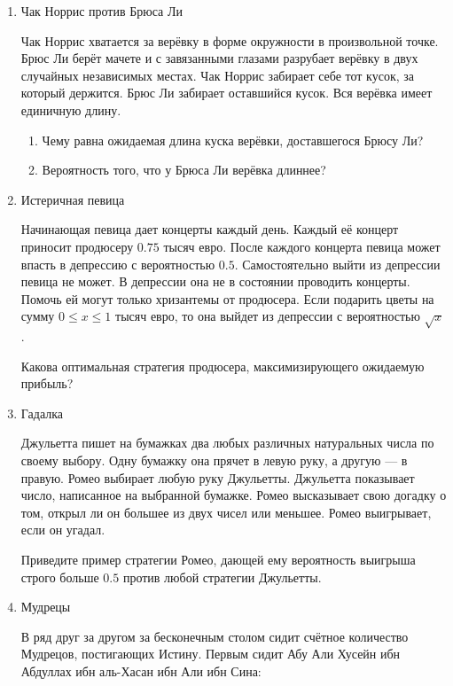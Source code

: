 \begin{enumerate}
\item Чак Норрис против Брюса Ли

Чак Норрис хватается за верёвку в форме окружности в произвольной точке.
Брюс Ли берёт мачете и с завязанными глазами разрубает верёвку в двух случайных
независимых местах. Чак Норрис забирает себе тот кусок, за который держится.
Брюс Ли забирает оставшийся кусок.  Вся верёвка имеет единичную длину.
\begin{enumerate}
\item Чему равна ожидаемая длина куска верёвки, доставшегося Брюсу Ли?
\item  Вероятность того, что у Брюса Ли верёвка длиннее?
\end{enumerate}

\item Истеричная певица

Начинающая певица дает концерты каждый день. Каждый её концерт приносит продюсеру
$0.75$ тысяч евро. После каждого концерта певица может впасть в депрессию
с вероятностью $0.5$. Самостоятельно выйти из депрессии певица не может.
В депрессии она не в состоянии проводить концерты. Помочь ей могут только хризантемы
от продюсера. Если подарить цветы на сумму $0\le x\le 1$ тысяч евро, то она выйдет
из депрессии с вероятностью $\sqrt{x}$.

Какова оптимальная стратегия продюсера, максимизирующего ожидаемую прибыль?

\item Гадалка

Джульетта пишет на бумажках два любых различных натуральных числа по своему выбору.
Одну бумажку она прячет в левую руку, а другую — в правую. Ромео выбирает любую руку
Джульетты. Джульетта показывает число, написанное на выбранной бумажке. Ромео высказывает
свою догадку о том, открыл ли он большее из двух чисел или меньшее. Ромео выигрывает,
если он угадал.

Приведите пример стратегии Ромео, дающей ему вероятность выигрыша строго больше
$0.5$ против любой стратегии Джульетты.

\item Мудрецы

В ряд друг за другом за бесконечным столом сидит счётное количество Мудрецов,
постигающих Истину. Первым сидит Абу Али Хусейн ибн Абдуллах ибн аль-Хасан ибн
Али ибн Сина:


\end{enumerate}
